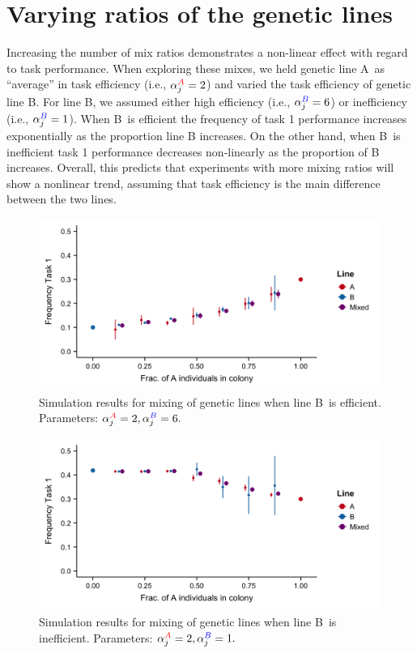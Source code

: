 \documentclass[11pt]{article}
\newcommand{\A}{{\color{red}A}}
\newcommand{\B}{{\color{blue}B}}
\begin{document}
\section{Varying ratios of the genetic lines} \label{sec:varyratios}
Increasing the number of mix ratios demonstrates a non-linear effect with regard to task performance. When exploring these mixes, we held genetic line \A\ as ``average'' in task efficiency (i.e., $\alpha_j^{\A} = 2$) and varied the task efficiency of genetic line \B. For line \B, we assumed either high efficiency (i.e., $\alpha_j^{\B} = 6$) or inefficiency (i.e., $\alpha_j^{\B} = 1$). When \B\ is efficient the frequency of task 1 performance increases exponentially as the proportion line B increases. On the other hand, when \B\ is inefficient task 1 performance decreases non-linearly as the proportion of B increases. Overall, this predicts that experiments with more mixing ratios will show a nonlinear trend, assuming that task efficiency is the main difference between the two lines. 

\begin{figure}[H]
    \centering
    \includegraphics[trim={0 0.25in 0 0.2in}, clip, width=0.9\linewidth]{doc/Mix_Alphas_B-super-efficient_Means.png}
    \caption{Simulation results for mixing of genetic lines when line \B\ is efficient. Parameters: $\alpha_j^{\A} = 2, \alpha_j^{\B} = 6.$}
    \label{fig:Mix_Alphas_B-efficient}
\end{figure}

\begin{figure}[H]
    \centering
    \includegraphics[trim={0 0.25in 0 0.2in}, clip, width=0.9\linewidth]{doc/Mix_Alphas_B-inefficient_Means.png}
    \caption{Simulation results for mixing of genetic lines when line \B\ is inefficient. Parameters: $\alpha_j^{\A} = 2, \alpha_j^{\B} = 1.$}
    \label{fig:Mix_Alphas_B-inefficient}
\end{figure}
\end{document}
